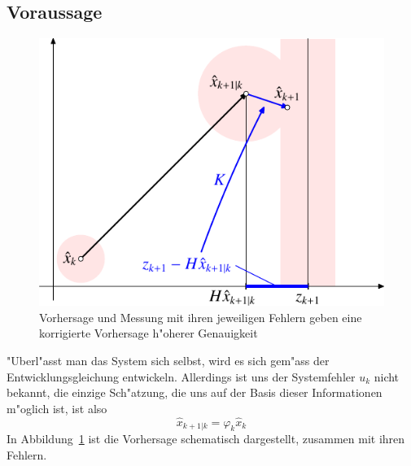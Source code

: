 \subsection{Voraussage}
\begin{figure}
\centering
\includegraphics{images/filter-2.pdf}
\caption{Vorhersage und Messung mit ihren jeweiligen Fehlern geben eine
korrigierte Vorhersage h"oherer Genauigkeit
\label{bild-vorhersage-korrektur}}
\end{figure}
"Uberl"asst man das System sich selbst, wird es sich gem"ass der
Entwicklungsgleichung entwickeln. Allerdings ist uns der Systemfehler
$u_k$ nicht bekannt, die einzige Sch"atzung, die uns auf der Basis dieser
Informationen m"oglich ist, ist also
\[
\hat x_{k+1|k}=\varphi_k\hat x_k
\]
In Abbildung~\ref{bild-vorhersage-korrektur} ist die Vorhersage schematisch
dargestellt, zusammen mit ihren Fehlern.

